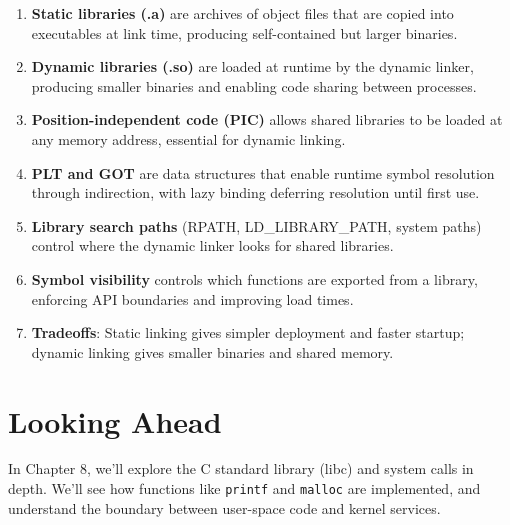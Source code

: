 \begin{enumerate}
    \item \textbf{Static libraries (.a)} are archives of object files that are copied into executables at link time, producing self-contained but larger binaries.
    \item \textbf{Dynamic libraries (.so)} are loaded at runtime by the dynamic linker, producing smaller binaries and enabling code sharing between processes.
    \item \textbf{Position-independent code (PIC)} allows shared libraries to be loaded at any memory address, essential for dynamic linking.
    \item \textbf{PLT and GOT} are data structures that enable runtime symbol resolution through indirection, with lazy binding deferring resolution until first use.
    \item \textbf{Library search paths} (RPATH, LD\_LIBRARY\_PATH, system paths) control where the dynamic linker looks for shared libraries.
    \item \textbf{Symbol visibility} controls which functions are exported from a library, enforcing API boundaries and improving load times.
    \item \textbf{Tradeoffs}: Static linking gives simpler deployment and faster startup; dynamic linking gives smaller binaries and shared memory.
\end{enumerate}

\section{Looking Ahead}

In Chapter 8, we'll explore the C standard library (libc) and system calls in depth. We'll see how functions like \texttt{printf} and \texttt{malloc} are implemented, and understand the boundary between user-space code and kernel services.
